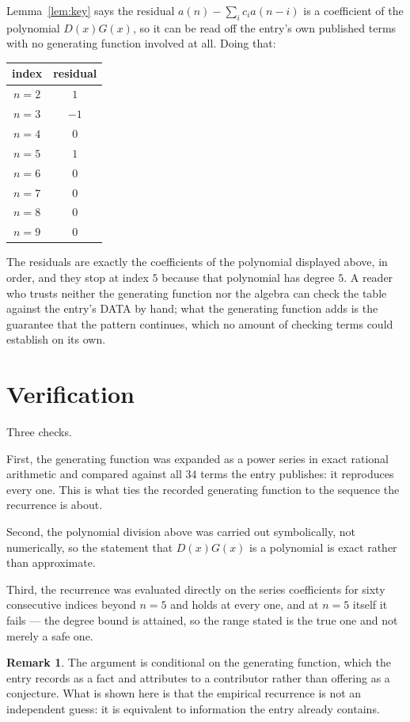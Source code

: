 \documentclass[11pt,a4paper]{article}
\theoremstyle{plain}
\theoremstyle{definition}
\newtheorem{remark}[theorem]{Remark}
\begin{document}
Lemma~\ref{lem:key} says the residual $a(n)-\sum_ic_ia(n-i)$ is a coefficient of the
polynomial $D(x)G(x)$, so it can be read off the entry's own published terms with no
generating function involved at all. Doing that:
\begin{center}
\begin{tabular}{cc}
index & residual \\ \hline
$n=2$ & $1$ \\
$n=3$ & $-1$ \\
$n=4$ & $0$ \\
$n=5$ & $1$ \\
$n=6$ & $0$ \\
$n=7$ & $0$ \\
$n=8$ & $0$ \\
$n=9$ & $0$
\end{tabular}
\end{center}
The residuals are exactly the coefficients of the polynomial displayed above, in order, and
they stop at index $5$ because that polynomial has degree $5$. A reader who trusts
neither the generating function nor the algebra can check the table against the entry's DATA
by hand; what the generating function adds is the guarantee that the pattern continues, which
no amount of checking terms could establish on its own.

\section{Verification}

Three checks.

First, the generating function was expanded as a power series in exact rational arithmetic and
compared against all $34$ terms the entry publishes: it reproduces every one. This is
what ties the recorded generating function to the sequence the recurrence is about.

Second, the polynomial division above was carried out symbolically, not numerically, so the
statement that $D(x)G(x)$ is a polynomial is exact rather than approximate.

Third, the recurrence was evaluated directly on the series coefficients for sixty consecutive
indices beyond $n=5$ and holds at every one, and at $n=5$ itself it fails --- the
degree bound is attained, so the range stated is the true one and not merely a safe one.

\begin{remark}
The argument is conditional on the generating function, which the entry records as a fact and
attributes to a contributor rather than offering as a conjecture. What is shown here is that
the empirical recurrence is not an independent guess: it is equivalent to information the
entry already contains.
\end{remark}
\end{document}
